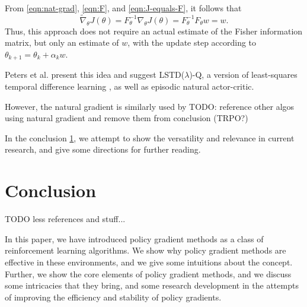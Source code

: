 From \eqref{eqn:nat-grad}, \eqref{eqn:F}, and \eqref{eqn:J-equals-F}, it follows that
\begin{equation}
  \widetilde{\nabla}_\theta J(\theta) = F^{-1}_\theta \nabla_\theta J(\theta) = F_\theta^{-1} F_\theta w = w.
\end{equation}
Thus, this approach does not require an actual estimate of the Fisher information matrix, but only an estimate of $w$, with the update step according to $\theta_{k+1} = \theta_k + \alpha_k w$.

Peters et al. \cite{4863} present this idea and suggest LSTD($\lambda$)-Q, a version of least-squares temporal difference learning  \cite{Boyan:1999:LTD:645528.657618}, as well as episodic natural actor-critic.

However, the natural gradient is similarly used by TODO: reference other algos using natural gradient and remove them from conclusion (TRPO?)

In the conclusion \ref{sec:outro}, we attempt to show the versatility and relevance in current research, and give some directions for further reading.

\section{Conclusion}
\label{sec:outro}

TODO less references and stuff...

In this paper, we have introduced policy gradient methods as a class of reinforcement learning algorithms. 
We show why policy gradient methods are effective in these environments, and we give some intuitions about the concept. 
Further, we show the core elements of policy gradient methods, and we discuss some intricacies that they bring, and some research development in the attempts of improving the efficiency and stability of policy gradients.

